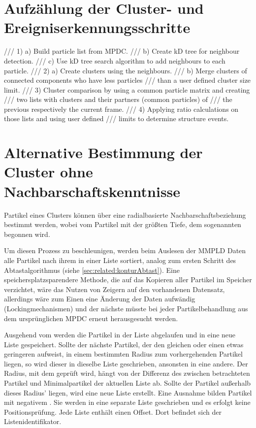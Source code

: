 \section{Aufzählung der Cluster- und Ereigniserkennungsschritte}\label{sec:cluster-ereignis-schritte}

/// 1) a) Build particle list from MPDC.
///    b) Create kD tree for neighbour detection.
///    c) Use kD tree search algorithm to add neighbours to each particle.
/// 2) a) Create clusters using the neighbours.
///    b) Merge clusters of connected components who have less particles
///       than a user defined cluster size limit.
/// 3) Cluster comparison by using a common particle matrix and creating
///    two lists with clusters and their partners (common particles) of
///    the previous respectively the current frame.
/// 4) Applying ratio calculations on those lists and using user defined
///    limits to determine structure events.

\section{Alternative Bestimmung der Cluster ohne Nachbarschaftskenntnisse}\label{sec:cluster-radial}
Partikel eines Clusters können über eine radialbasierte Nachbarschaftsbeziehung bestimmt werden, wobei vom Partikel mit der größten Tiefe, dem sogenannten  begonnen wird.

Um diesen Prozess zu beschleunigen, werden beim Auslesen der MMPLD Daten alle Partikel nach ihrem  in einer Liste sortiert, analog zum ersten Schritt des Abtastalgorithmus (siehe \autoref{sec:related:konturAbtast}). Eine speichersplatzsparendere Methode, die auf das Kopieren aller Partikel im Speicher verzichtet, wäre das Nutzen von Zeigern auf den vorhandenen Datensatz, allerdings wäre zum Einen eine Änderung der Daten aufwändig (Lockingmechanismen) und der nächste  müsste bei jeder Partikelbehandlung aus dem ursprünglichen MPDC erneut herausgesucht werden.

Ausgehend vom  werden die Partikel in der Liste abgelaufen und in eine neue Liste gespeichert. Sollte der nächste Partikel, der den gleichen oder einen etwas geringeren  aufweist, in einem bestimmten Radius zum vorhergehenden Partikel liegen, so wird dieser in dieselbe Liste geschrieben, ansonsten in eine andere. Der Radius, mit dem geprüft wird, hängt von der Differenz des  zwischen betrachteten Partikel und Minimalpartikel der aktuellen Liste ab. Sollte der Partikel außerhalb dieses Radius' liegen, wird eine neue Liste erstellt. Eine Ausnahme bilden Partikel mit negativem . Sie werden in eine separate Liste geschrieben und es erfolgt keine Positionsprüfung. Jede Liste enthält einen Offset. Dort befindet sich der Listenidentifikator.

